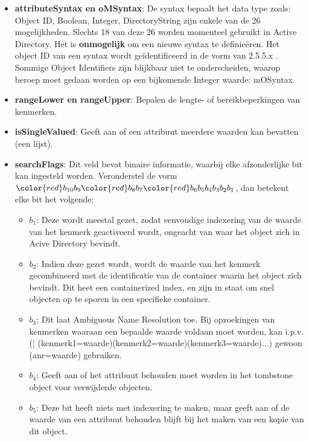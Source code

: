 \begin{enumerate}
		 { 
			\begin{itemize}
				\item \textbf{attributeSyntax en oMSyntax}: De syntax bepaalt het data type zoals: Object ID, Boolean, Integer, DirectoryString zijn enkele van de 26 mogelijkheden. Slechts 18 van deze 26 worden momenteel gebruikt in Active Directory. Het is \textbf{onmogelijk} om een nieuwe syntax te definieëren. Het object ID van een syntax wordt geïdentificeerd in de vorm van 2.5.5.x . Sommige Object Identifiers zijn blijkbaar niet te onderscheiden, waarop beroep moet gedaan worden op een bijkomende Integer waarde: mOSyntax.
				\item \textbf{rangeLower en rangeUpper}: Bepalen de lengte- of bereikbeperkingen van kenmerken.
				\item \textbf{isSingleValued}: Geeft aan of een attribuut meerdere waarden kan bevatten (een lijst).
				\item \textbf{searchFlags}: Dit veld bevat binaire informatie, waarbij elke afzonderlijke bit kan ingesteld worden. Veronderstel de vorm ${\color{red}b_{10}}b_9{\color{red}b_8}b_7{\color{red}b_6b_5b_4b_3b_2b_1}$, dan betekent elke bit het volgende:
				\begin{itemize}
					\item \textbf{$b_1$}: Deze wordt meestal gezet, zodat eenvoudige indexering van de waarde van het kenmerk geactiveerd wordt, ongeacht van waar het object zich in Acive Directory bevindt.
					\item \textbf{$b_2$}: Indien deze gezet wordt, wordt de waarde van het kenmerk gecombineerd met de identificatie van de container waarin het object zich bevindt. Dit heet een containerized index, en zijn in staat om snel objecten op te sporen in een specifieke container.
					\item \textbf{$b_3$}: Dit laat Ambiguous Name Resolution toe. Bij opzoekingen van kenmerken waaraan een bepaalde waarde voldaan moet worden, kan i.p.v. \\ ($\mid$ (kenmerk1=waarde)(kenmerk2=waarde)(kenmerk3=waarde)...) gewoon (anr=waarde) gebruiken. 
					\item \textbf{$b_4$}: Geeft aan of het attribuut behouden moet worden in het tombstone object voor verwijderde objecten.
					\item \textbf{$b_5$}: Deze bit heeft niets met indexering te maken, maar geeft aan of de waarde van een attribuut behouden blijft bij het maken van een kopie van dit object.

\end{itemize}
\end{itemize}}
\end{enumerate}
